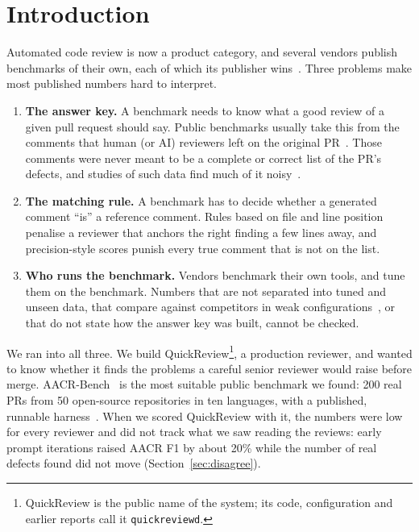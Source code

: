 \documentclass[11pt,a4paper]{article}
\newcommand{\qcr}{QuickReview}
\newcommand{\code}[1]{\texttt{#1}}
\begin{document}
\tableofcontents
\clearpage

\section{Introduction}
\label{sec:intro}

Automated code review is now a product category, and several vendors publish
benchmarks of their own, each of which its publisher
wins~\cite{greptilebench,qodobench,deepsourcebench}. Three problems make most
published numbers hard to interpret.

\begin{enumerate}
  \item \textbf{The answer key.} A benchmark needs to know what a good review
  of a given pull request should say. Public benchmarks usually take this
  from the comments that human (or AI) reviewers left on the original
  PR~\cite{aacrbench,codereviewer,contextcrbench,swrbench}. Those comments
  were never meant to be a complete or correct list of the PR's defects, and
  studies of such data find much of it noisy~\cite{liu2025noisy,lu2025deepcrceval}.
  \item \textbf{The matching rule.} A benchmark has to decide whether a
  generated comment ``is'' a reference comment. Rules based on file and line
  position penalise a reviewer that anchors the right finding a few lines
  away, and precision-style scores punish every true comment that is not on
  the list.
  \item \textbf{Who runs the benchmark.} Vendors benchmark their own tools,
  and tune them on the benchmark. Numbers that are not separated into tuned
  and unseen data, that compare against competitors in weak
  configurations~\cite{melis2018,lucic2018}, or that do not state how the
  answer key was built, cannot be checked.
\end{enumerate}

We ran into all three. We build \qcr{}\footnote{\qcr{} is the public name of
the system; its code, configuration and earlier reports call it
\code{quickreviewd}.}, a production reviewer, and wanted to know whether it
finds the problems a careful senior reviewer would raise before merge.
AACR-Bench~\cite{aacrbench} is the most suitable public benchmark we found:
200 real PRs from 50 open-source repositories in ten languages, with a
published, runnable harness~\cite{aacrrepo}. When we scored \qcr{} with it,
the numbers were low for every reviewer and did not track what we saw reading
the reviews: early prompt iterations raised AACR F1 by about 20\% while the
number of real defects found did not move (Section~\ref{sec:disagree}).
\end{document}
